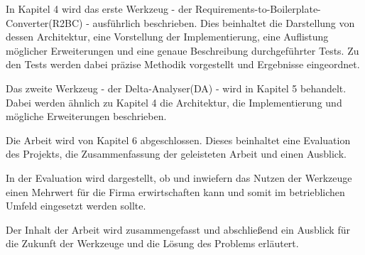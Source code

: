 \documentclass[12pt]{report}
\begin{document}
In Kapitel 4 wird das erste Werkzeug - der Requirements-to-Boilerplate-Converter(R2BC) - ausführlich beschrieben. Dies beinhaltet die Darstellung von dessen Architektur, eine Vorstellung der Implementierung, eine Auflistung möglicher Erweiterungen und eine genaue Beschreibung durchgeführter Tests. Zu den Tests werden dabei präzise Methodik vorgestellt und Ergebnisse eingeordnet. 

Das zweite Werkzeug - der Delta-Analyser(DA) - wird in Kapitel 5 behandelt. Dabei werden ähnlich zu Kapitel 4 die Architektur, die Implementierung und mögliche Erweiterungen beschrieben. 

Die Arbeit wird von Kapitel 6 abgeschlossen. Dieses beinhaltet eine Evaluation des Projekts, die Zusammenfassung der geleisteten Arbeit und einen Ausblick. 

In der Evaluation wird dargestellt, ob und inwiefern das Nutzen der Werkzeuge einen Mehrwert für die Firma erwirtschaften kann und somit im betrieblichen Umfeld eingesetzt werden sollte. 

Der Inhalt der Arbeit wird zusammengefasst und abschließend ein Ausblick für die Zukunft der Werkzeuge und die Lösung des Problems erläutert. 
\end{document}
